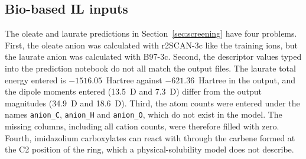 \subsection{Bio-based IL inputs}
\label{sec:issue-bio}
The oleate and laurate predictions in Section~\ref{sec:screening} have four problems. First, the oleate anion was calculated with r2SCAN-3c like the training ions, but the laurate anion was calculated with B97-3c\cite{brandenburg2018b973c}. Second, the descriptor values typed into the prediction notebook do not all match the output files. The laurate total energy entered is $-1516.05$~Hartree against $-621.36$~Hartree in the output, and the dipole moments entered (13.5~D and 7.3~D) differ from the output magnitudes (34.9~D and 18.6~D). Third, the atom counts were entered under the names \texttt{anion\_C}, \texttt{anion\_H} and \texttt{anion\_O}, which do not exist in the model. The missing columns, including all cation counts, were therefore filled with zero. Fourth, imidazolium carboxylates can react with \co{} through the carbene formed at the C2 position of the ring, which a physical-solubility model does not describe.
